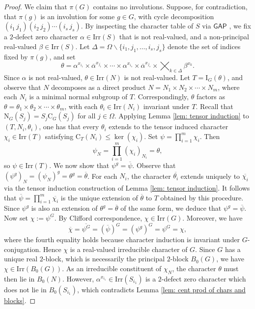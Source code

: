 \documentclass[10pt]{article}
\begin{document}
\begin{proof}
We claim that $\pi(G)$ contains no involutions. 
Suppose, for contradiction, that $\pi(g)$ is an involution for some $g \in G$, with cycle decomposition
$(i_1\,j_1)(i_2\,j_2)\cdots(i_s\,j_s)$.
By inspecting the character table of $S$ via $\mathsf{GAP}$ \cite{gap},
we fix a $2$-defect zero character $\alpha \in \mathrm{Irr}(S)$ that is not real-valued, 
and a non-principal real-valued $\beta\in \mathrm{Irr}(S)$.
Let $\Delta=\Omega\smallsetminus\{ i_1,j_1,\dots ,i_s,j_s \}$ denote the set of indices fixed by $\pi(g)$,
and set
  $$\theta= \alpha^{x_{i_1}}\times \overline{\alpha}^{x_{j_1}}\times \cdots \times \alpha^{x_{i_s}}\times \overline{\alpha}^{x_{j_s}}\times \bigtimes_{k\in \Delta} \beta^{x_k}.$$
  Since $\alpha$ is not real-valued, $\theta \in \mathrm{Irr}(N)$ is not real-valued.
  Let $T=\mathrm{I}_{G}(\theta)$, and observe that $N$ decomposes as a direct product $N = N_1 \times N_2 \times \cdots \times N_m$, where each $N_i$ is a minimal normal subgroup of $T$.
  Correspondingly, $\theta$ factors as $\theta = \theta_1 \times \theta_2 \times \cdots \times \theta_m$, with each $\theta_i \in \mathrm{Irr}(N_i)$ invariant under $T$.
  Recall that $\mathrm{N}_{G}(S_j)=S_j\mathrm{C}_{G}(S_j)$ for all $j\in \Omega$.
  Applying Lemma \ref{lem: tensor induction} to $(T,N_i,\theta_i)$, 
  one has that
  every $\theta_i$ extends to the tensor induced character $\chi_i \in \mathrm{Irr}(T)$ satisfying 
  $\mathrm{C}_T(N_i) \leq \ker(\chi_i)$.
Set $\psi = \prod_{i=1}^{m} \chi_i$. Then
\[
\psi_N = \prod_{i=1}^{m} (\chi_i)_{N_i} = \theta,
\]
so $\psi \in \mathrm{Irr}(T)$. 
  We now show that $\psi^g=\overline{\psi}$. 
  Observe that
  $(\psi^g)_N=(\psi_N)^{g}=\theta^g=\overline{\theta}$.
  For each $N_i$, the character $\overline{\theta_i}$ extends uniquely to $\overline{\chi_i}$ via the tensor induction construction of Lemma \ref{lem: tensor induction}. It follows that $\overline{\psi} = \prod_{i=1}^{m} \overline{\chi_i}$ is the unique extension of $\overline{\theta}$ to $T$ obtained by this procedure. Since $\psi^g$ is also an extension of $\theta^g=\overline{\theta}$ of the same form, we deduce that $\psi^g = \overline{\psi}$. 
Now set $\chi := \psi^G$. By Clifford correspondence, $\chi \in \mathrm{Irr}(G)$. Moreover, we have
\[
\overline{\chi} = \overline{\psi^G} = (\overline{\psi})^G = (\psi^g)^G = \psi^G = \chi,
\]
where the fourth equality holds because character induction is invariant under $G$-conjugation. Hence $\chi$ is a real-valued irreducible character of $G$.
Since $G$ has a unique real $2$-block, which is necessarily the principal $2$-block $B_0(G)$, we have $\chi \in \mathrm{Irr}(B_0(G))$. As an irreducible constituent of $\chi_N$, the character $\theta$ must then lie in $B_0(N)$. 
However, $\alpha^{x_{i_1}}\in \mathrm{Irr}(S_{i_1})$ is a $2$-defect zero character which does not lie in 
$B_0(S_{i_1})$, which contradicts Lemma \ref{lem: cent prod of chars and blocks}.



\end{proof}
\end{document}
